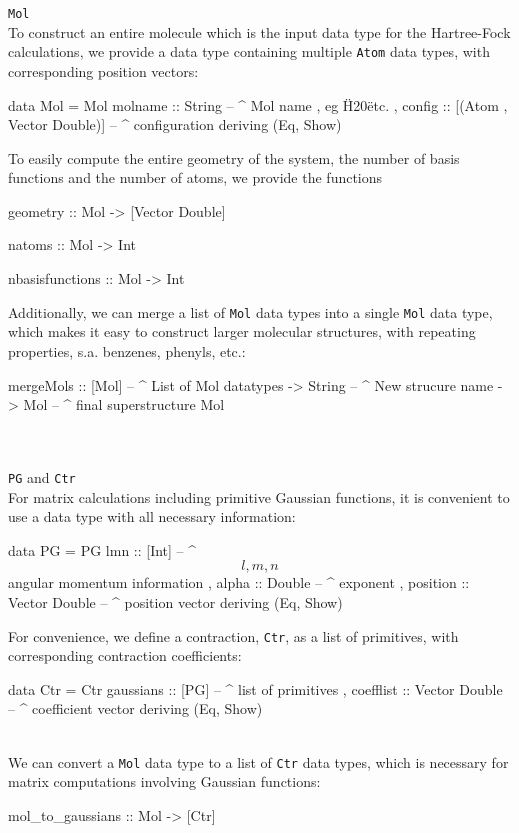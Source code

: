 \documentclass[twoside,        %
			   11pt,			%
               BCOR10mm,       %
               ngerman,english  %
               ]{scrartcl}
\begin{document}
\large{\texttt{Mol}}\\
To construct an entire molecule which is the input data type for the Hartree-Fock calculations, we provide a data type containing multiple \texttt{Atom} data types, with corresponding position vectors:
\begin{code}
data Mol = Mol {  molname :: String		-- ^ Mol name , eg \"H20\" etc.  
		, config :: [(Atom , Vector Double)] -- ^ configuration  
		} deriving (Eq, Show)
\end{code}
To easily compute the entire geometry of the system, the number of basis functions and the number of atoms, we provide the functions
\begin{code}
geometry :: Mol -> [Vector Double]

natoms :: Mol -> Int

nbasisfunctions :: Mol -> Int
\end{code}
Additionally, we can merge a list of \texttt{Mol} data types into a single \texttt{Mol} data type, which makes it easy to construct larger molecular structures, with repeating properties, s.a. benzenes, phenyls, etc.:
\begin{code}
mergeMols :: [Mol] -- ^ List of Mol datatypes
			-> String -- ^ New strucure name
			-> Mol -- ^ final superstructure Mol
\end{code}\\ \\

\large{\texttt{PG} and \texttt{Ctr}}\\
For matrix calculations including primitive Gaussian functions, it is convenient to use a data type with all necessary information:
\begin{code}
data PG = PG { lmn :: [Int]	-- ^ \[l,m,n\] angular momentum information  
		, alpha :: Double -- ^ exponent  
		, position :: Vector Double -- ^ position vector  
		} deriving (Eq, Show)
\end{code}
For convenience, we define a contraction, \texttt{Ctr}, as a list of primitives, with corresponding contraction coefficients:
\begin{code}
data Ctr = Ctr{ gaussians :: [PG]	-- ^ list of primitives  
		, coefflist :: Vector Double -- ^ coefficient vector  
		} deriving (Eq, Show)
\end{code} \\

We can convert a \texttt{Mol} data type to a list of \texttt{Ctr} data types, which is necessary for matrix computations involving Gaussian functions:
\begin{code}
mol_to_gaussians :: Mol -> [Ctr]
\end{code}
\end{document}
